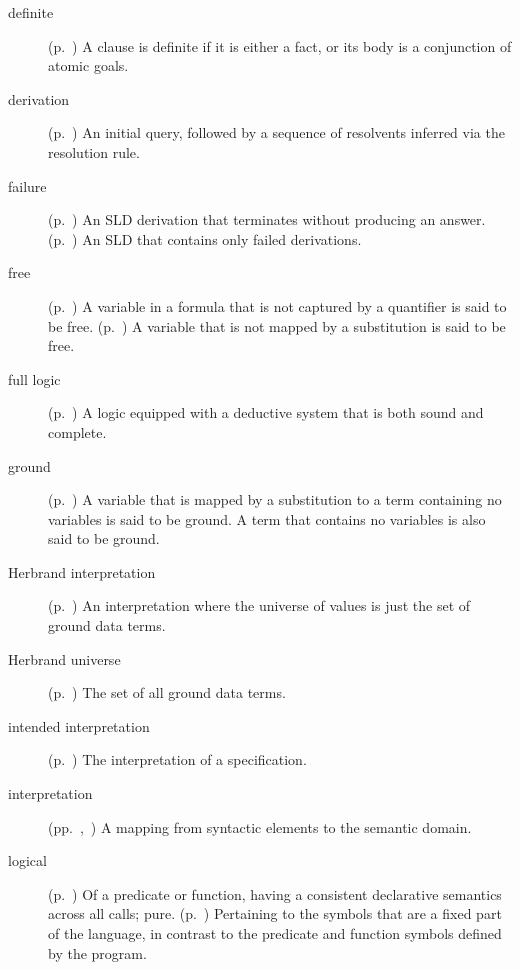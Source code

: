 \begin{description}
\item[definite]
(p.~\pageref{gi:definite})
A clause is definite if it is either a fact,
or its body is a conjunction of atomic goals.

\item[derivation]
(p.~\pageref{gi:derivation})
An initial query,
followed by a sequence of resolvents inferred
via the resolution rule.

\item[failure]
(p.~\pageref{gi:failure})
An SLD derivation that terminates without producing an answer.
(p.~\pageref{gi:failure2})
An SLD that contains only failed derivations.

\item[free]
(p.~\pageref{gi:free})
A variable in a formula that is not captured by a quantifier
is said to be free.
(p.~\pageref{gi:free2})
A variable that is not mapped by a substitution is said to be free.

\item[full logic]
(p.~\pageref{gi:full-logic})
A logic equipped with a deductive system that is both sound and complete.

\item[ground]
(p.~\pageref{gi:ground})
A variable that is mapped by a substitution
to a term containing no variables
is said to be ground.
A term that contains no variables is also said to be ground.

\item[Herbrand interpretation]
(p.~\pageref{gi:herbrand-interpretation})
An interpretation where the universe of values
is just the set of ground data terms.

\item[Herbrand universe]
(p.~\pageref{gi:herbrand-universe})
The set of all ground data terms.

\item[intended interpretation]
(p.~\pageref{gi:intended-interpretation})
The interpretation of a specification.

\item[interpretation]
(pp.~\pageref{gi:interpretation},~\pageref{sec:interpretations})
A mapping from syntactic elements to the semantic domain.

\item[logical]
(p.~\pageref{gi:non-logical})
Of a predicate or function,
having a consistent declarative semantics across all calls; pure.
(p.~\pageref{gi:non-logical2})
Pertaining to the symbols that are a fixed part of the language,
in contrast to the predicate and function symbols defined by the program.


\end{description}

